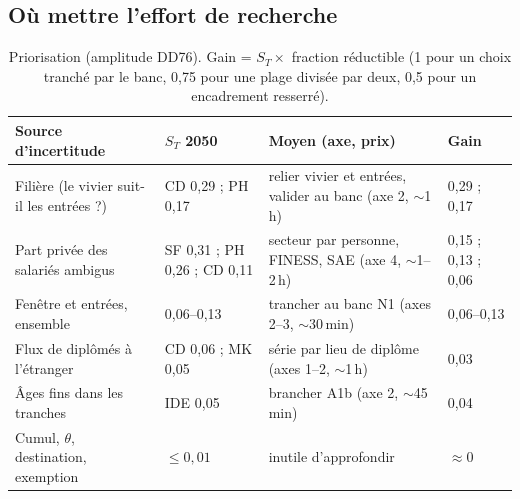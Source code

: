 \subsection{Où mettre l'effort de recherche}
\begin{table}[h]\centering\small
\begin{tabular}{p{4cm}p{3.1cm}p{4.5cm}p{2.2cm}}
\toprule
Source d'incertitude & $S_T$ 2050 & Moyen (axe, prix\suppose{}) & Gain\derive{} \\
\midrule
Filière (le vivier suit-il les entrées ?) & CD 0,29 ; PH 0,17\mesure{} & relier vivier et entrées, valider au banc (axe 2, $\sim$1\,h) & 0,29 ; 0,17 \\
Part privée des salariés ambigus & SF 0,31 ; PH 0,26 ; CD 0,11\mesure{} & secteur par personne, FINESS, SAE (axe 4, $\sim$1--2\,h) & 0,15 ; 0,13 ; 0,06 \\
Fenêtre et entrées, ensemble & 0,06--0,13\mesure{} & trancher au banc N1 (axes 2--3, $\sim$30\,min) & 0,06--0,13 \\
Flux de diplômés à l'étranger & CD 0,06 ; MK 0,05\mesure{} & série par lieu de diplôme (axes 1--2, $\sim$1\,h) & 0,03 \\
Âges fins dans les tranches & IDE 0,05\mesure{} & brancher A1b (axe 2, $\sim$45\,min) & 0,04 \\
Cumul, $\theta$, destination, exemption & $\le 0{,}01$\mesure{} & inutile d'approfondir & $\approx 0$ \\
\bottomrule
\end{tabular}
\caption{Priorisation (amplitude DD76). Gain = $S_T \times$ fraction réductible (1 pour un choix tranché par le
banc, 0,75 pour une plage divisée par deux, 0,5 pour un encadrement resserré).}\label{a5-tab:prio}
\end{table}

